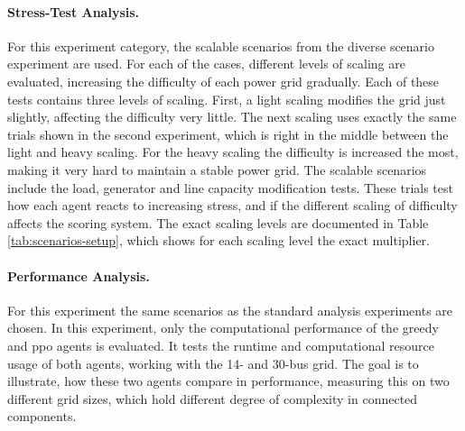 \paragraph{Stress-Test Analysis.}
For this experiment category, the scalable scenarios from the diverse scenario experiment are used. For each of the cases, different levels of scaling are evaluated, increasing the difficulty of each power grid gradually. Each of these tests contains three levels of scaling. First, a light scaling modifies the grid just slightly, affecting the difficulty very little. The next scaling uses exactly the same trials shown in the second experiment, which is right in the middle between the light and heavy scaling. For the heavy scaling the difficulty is increased the most, making it very hard to maintain a stable power grid. The scalable scenarios include the load, generator and line capacity modification tests. These trials test how each agent reacts to increasing stress, and if the different scaling of difficulty affects the scoring system. The exact scaling levels are documented in Table \ref{tab:scenarios-setup}, which shows for each scaling level the exact multiplier.

\paragraph{Performance Analysis.}
For this experiment the same scenarios as the standard analysis experiments are chosen. In this experiment, only the computational performance of the greedy and \ac{ppo} agents is evaluated. It tests the runtime and computational resource usage of both agents, working with the 14- and 30-bus grid. The goal is to illustrate, how these two agents compare in performance, measuring this on two different grid sizes, which hold different degree of complexity in connected components. 


